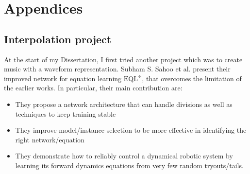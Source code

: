\documentclass[12pt]{report}
\begin{document}
\newpage





\newpage

\chapter*{Appendices}
\appendix

\section{Interpolation project}

At the start of my Dissertation, I first tried another project which was to create music with a waveform representation.
Subham S. Sahoo et al. \cite{sahoo_learning_2018} present their improved network for equation learning $\text{EQL}^\div$, that overcomes the limitation of the earlier works. In particular, their main contribution are:
\begin{itemize}
    \item They propose a network architecture that can handle divisions as well as techniques to keep training stable
    \item They improve model/instance selection to be more effective in identifying the right network/equation
    \item They demonstrate how to reliably control a dynamical robotic system by learning its forward dynamics equations from very few random tryouts/tails.
\end{itemize}
\end{document}
